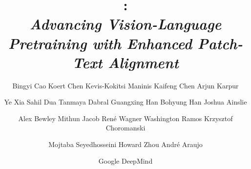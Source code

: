 \title{{\textbf{\tipsvtwo}}:\\ \textit{Advancing Vision-Language Pretraining with Enhanced Patch-Text Alignment}}

\author{
\centerline{
Bingyi Cao\footnotemark[1]\hspace{8pt}  
Koert Chen\footnotemark[1]\hspace{8pt} 
Kevis-Kokitsi Maninis\hspace{8pt} 
Kaifeng Chen\footnotemark[2]\hspace{8pt} 
Arjun Karpur\footnotemark[2]}
\and\centerline{
Ye Xia\hspace{8pt}
Sahil Dua\hspace{8pt} 
Tanmaya Dabral\hspace{8pt}
Guangxing Han\hspace{8pt}
Bohyung Han\footnotemark[2]\hspace{8pt}
Joshua Ainslie
}
\and\centerline{
Alex Bewley\hspace{8pt}
Mithun Jacob\hspace{8pt} 
René Wagner\hspace{8pt} 
Washington Ramos\footnotemark[2]\hspace{8pt}
Krzysztof Choromanski
}
\and\centerline{
Mojtaba Seyedhosseini\hspace{8pt} 
Howard Zhou\hspace{8pt}
André Araujo}
\and\centerline{Google DeepMind} 
}
